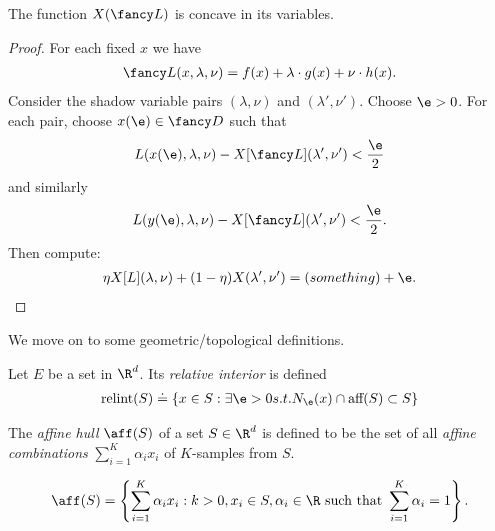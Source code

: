 \begin{prop}
	The function $X(\fancy L)$ is concave in its variables.
\end{prop}

\begin{proof}
	For each fixed $x$ we have
	\begin{align}
		\fancy L(x,\lambda,\nu) = f(x) + \lambda \cdot g(x) 
										+ \nu \cdot h(x).
	\end{align}
	Consider the shadow variable pairs $(\lambda,\nu)$ and
	$(\lambda',\nu')$. Choose $\e > 0$. For each pair, choose
	$x(\e) \in \fancy D$ such that 
	\begin{align}
		L(x(\e),\lambda,\nu) - X[\fancy L](\lambda',\nu')  
		< \frac{\e}{2}
	\end{align}
	and similarly
	\begin{align}
		L(y(\e),\lambda,\nu) - X[\fancy L](\lambda',\nu')
		 < \frac{\e}{2}.
	\end{align}
	Then compute:
	\begin{align}
		\eta X[L](\lambda,\nu) + (1-\eta) X(\lambda',\nu') 
		= (something ) + \e.
	\end{align}
	
\end{proof}

We move on to some geometric/topological definitions.

\begin{defn}
	Let $E$ be a set in $\R^d$. Its \emph{relative interior} is
	defined 
	\begin{align}\label{def:relint}
		\text{relint}(S) \doteq \{ x \in S : \exists \e > 0 s.t. 
									N_\e(x) \cap \text{aff}(S) 
									\subset S \}
	\end{align}
	
\end{defn}

\begin{defn}
	The \emph{affine hull} $\aff(S)$ of a set $S \in \R^d$ is
	defined to be the set of all \emph{affine combinations}
	$\sum_{i=1}^K \alpha_i x_i$ of $K$-samples from $S$.
	
	\begin{align}
		\aff(S) = \left\{ \sum_{i=1}^K \alpha_i x_i : k > 0, 
							x_i \in S, \alpha_i \in \R 
							\text{ such that } \sum_{i=1}^K 		
							\alpha_i = 1 \right\}.
	\end{align}

\end{defn}

